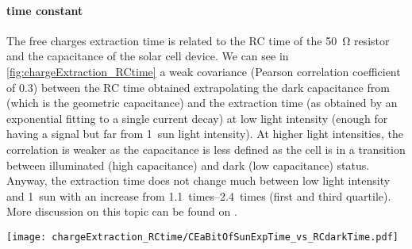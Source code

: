 		\paragraph{ time constant}\label{ce_time}
		The free charges extraction time is related to the RC time of the \SI{50}{\ohm} resistor and the capacitance of the solar cell device.
		We can see in \cref{fig:chargeExtraction_RCtime} a weak covariance (Pearson correlation coefficient of 0.3) between the RC time obtained extrapolating the dark capacitance from  (which is the geometric capacitance) and the extraction time (as obtained by an exponential fitting to a single  current decay) at low light intensity (enough for having a signal but far from 1~sun light intensity).
		At higher light intensities, the correlation is weaker as the capacitance is less defined as the cell is in a transition between illuminated (high capacitance) and dark (low capacitance) status.
		Anyway, the extraction time does not change much between low light intensity and 1~sun with an increase from \SIrange{1.1}{2.4}{times} (first and third quartile).
		More discussion on this topic can be found on .

		\begin{SCfigure}%
			\centering
			\texttt{[image: chargeExtraction\_RCtime/CEaBitOfSunExpTime\_vs\_RCdarkTime.pdf]}
			\label{fig:chargeExtraction_RCtime}
		\end{SCfigure}


